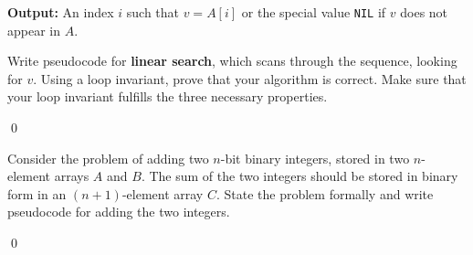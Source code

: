 \textbf{Output:} An index $i$ such that $v = A[i]$ or the special value \verb|NIL| if $v$ does not appear in $A$.

Write pseudocode for \textbf{linear search}, which scans through the sequence, looking for $v$. Using a loop invariant, prove that your algorithm is correct. Make sure that your loop invariant fulfills the three necessary properties.

\sol \qed

 Consider the problem of adding two $n$-bit binary integers, stored in two $n$-element arrays $A$ and $B$. The sum of the two integers should be stored in binary form in an $(n+1)$-element array $C$. State the problem formally and write pseudocode for adding the two integers.

\sol \qed